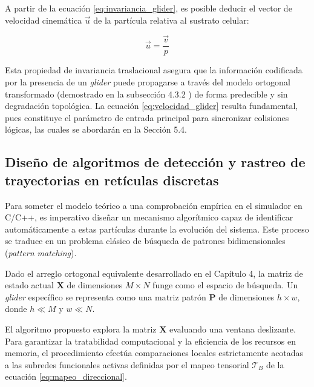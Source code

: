 A partir de la ecuación \eqref{eq:invariancia_glider}, es posible deducir el vector de velocidad cinemática $\vec{u}$ de la partícula relativa al sustrato celular:

\begin{equation}
\vec{u} = \frac{\vec{v}}{p}
\label{eq:velocidad_glider}
\end{equation}

Esta propiedad de invariancia traslacional asegura que la información codificada por la presencia de un \textit{glider} puede propagarse a través del modelo ortogonal transformado (demostrado en la subsección 4.3.2 %
) de forma predecible y sin degradación topológica. La ecuación \eqref{eq:velocidad_glider} resulta fundamental, pues constituye el parámetro de entrada principal para sincronizar colisiones lógicas, las cuales se abordarán en la Sección 5.4.

\subsection{Diseño de algoritmos de detección y rastreo de trayectorias en retículas discretas}
\label{subsec:algoritmos_deteccion}

Para someter el modelo teórico a una comprobación empírica en el simulador en C/C++, es imperativo diseñar un mecanismo algorítmico capaz de identificar automáticamente a estas partículas durante la evolución del sistema. Este proceso se traduce en un problema clásico de búsqueda de patrones bidimensionales (\textit{pattern matching}).

Dado el arreglo ortogonal equivalente desarrollado en el Capítulo 4, la matriz de estado actual $\mathbf{X}$ de dimensiones $M \times N$ funge como el espacio de búsqueda. Un \textit{glider} específico se representa como una matriz patrón $\mathbf{P}$ de dimensiones $h \times w$, donde $h \ll M$ y $w \ll N$.

El algoritmo propuesto explora la matriz $\mathbf{X}$ evaluando una ventana deslizante. Para garantizar la tratabilidad computacional y la eficiencia de los recursos en memoria, el procedimiento efectúa comparaciones locales estrictamente acotadas a las subredes funcionales activas definidas por el mapeo tensorial $\mathcal{T}_B$ de la ecuación \eqref{eq:mapeo_direccional}. %

